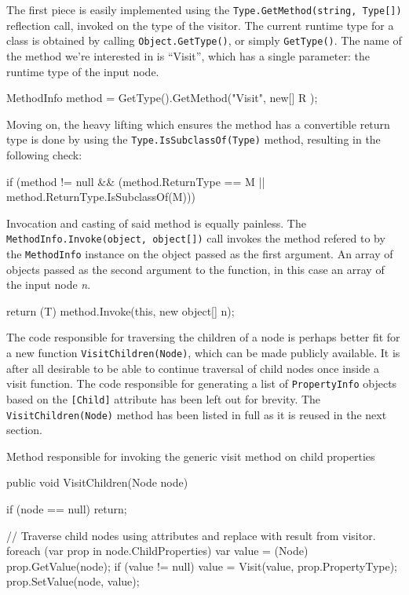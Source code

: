 \documentclass[twoside,openright]{uva-bachelor-thesis}
\newcommand{\code}[1]{\texttt{\footnotesize#1}}
\begin{document}
			The first piece is easily implemented using the \code{Type.GetMethod(string, Type[])} reflection call, invoked on the type of the visitor. The current runtime type for a class is obtained by calling \code{Object.GetType()}, or simply \code{GetType()}. The name of the method we're interested in is ``Visit'', which has a single parameter: the runtime type of the input node.
			\begin{codespan}
				\begin{csharpcode}
					MethodInfo method = GetType().GetMethod("Visit", new[] { R });
				\end{csharpcode}
			\end{codespan}
			
			Moving on, the heavy lifting which ensures the method has a convertible return type is done by using the \code{Type.IsSubclassOf(Type)} method, resulting in the following check:
			\begin{codespan}
				\begin{csharpcode}
					if (method != null && (method.ReturnType == M || method.ReturnType.IsSubclassOf(M)))
				\end{csharpcode}
			\end{codespan}
			
			Invocation and casting of said method is equally painless. The \code{MethodInfo.Invoke(object, object[])} call invokes the method refered to by the \code{MethodInfo} instance on the object passed as the first argument. An array of objects passed as the second argument to the function, in this case an array of the input node \emph{n}.
			\begin{codespan}
				\begin{csharpcode}
					return (T) method.Invoke(this, new object[] {n});
				\end{csharpcode}
			\end{codespan}
			
			The code responsible for traversing the children of a node is perhaps better fit for a new function \code{VisitChildren(Node)}, which can be made publicly available. It is after all desirable to be able to continue traversal of child nodes once inside a visit function. The code responsible for generating a list of \code{PropertyInfo} objects based on the \code{[Child]} attribute has been left out for brevity. The \code{VisitChildren(Node)} method has been listed in full as it is reused in the next section.
			
			\begin{codebox}[label=visit-children]{Method responsible for invoking the generic visit method on child properties}
				\begin{csharpcode}
					public void VisitChildren(Node node)
					{
						if (node == null)
							return;
						
						// Traverse child nodes using attributes and replace with result from visitor.
						foreach (var prop in node.ChildProperties)
						{
							var value = (Node) prop.GetValue(node);
							if (value != null)
							{
								value = Visit(value, prop.PropertyType);
								prop.SetValue(node, value);
							}
						}
					}
				\end{csharpcode}
			\end{codebox}
			
\end{document}
